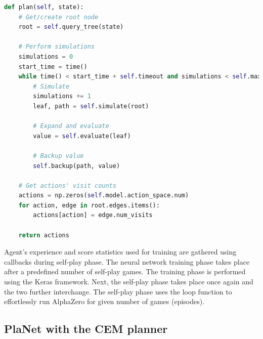 \begin{lstlisting}[language=Python]
def plan(self, state):
    # Get/create root node
    root = self.query_tree(state)

    # Perform simulations
    simulations = 0
    start_time = time()
    while time() < start_time + self.timeout and simulations < self.max_simulations:
        # Simulate
        simulations += 1
        leaf, path = self.simulate(root)

        # Expand and evaluate
        value = self.evaluate(leaf)

        # Backup value
        self.backup(path, value)

    # Get actions' visit counts
    actions = np.zeros(self.model.action_space.num)
    for action, edge in root.edges.items():
        actions[action] = edge.num_visits

    return actions
\end{lstlisting}

Agent's experience and score statistics used for training are gathered using callbacks during self-play phase. The neural network training phase takes place after a predefined number of self-play games. The training phase is performed using the Keras \cite{Code.Keras} framework. Next, the self-play phase takes place once again and the two further interchange. The self-play phase uses the loop function to effortlessly run AlphaZero for given number of games (episodes).

\subsection{PlaNet with the CEM planner}

